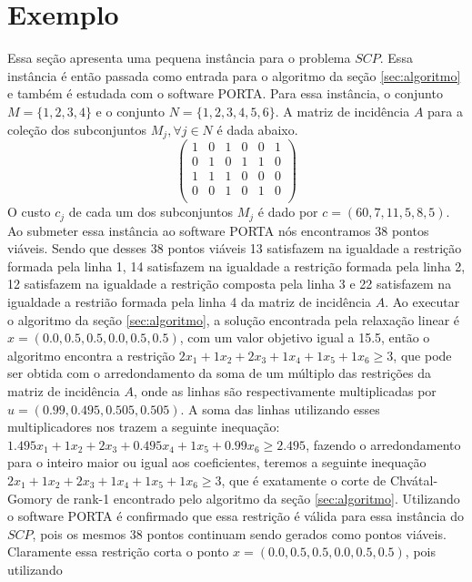 \section{Exemplo}\label{sec:exemplo} 
Essa seção apresenta uma pequena instância para o problema $SCP$. Essa instância é então 
passada como entrada para o algoritmo da seção \ref{sec:algoritmo} e também é estudada com o software PORTA.
Para essa instância, o conjunto $M=\{1,2,3,4\}$ e o conjunto $N=\{1,2,3,4,5,6\}$. A matriz de incidência
$A$ para a coleção dos subconjuntos $M_j, \forall j \in N$ é dada abaixo.
$$
\begin{pmatrix} 
    1 & 0 & 1 & 0 & 0 & 1 \\ 
    0 & 1 & 0 & 1 & 1 & 0 \\ 
    1 & 1 & 1 & 0 & 0 & 0 \\ 
    0 & 0 & 1 & 0 & 1 & 0 \\ 
\end{pmatrix}
$$
O custo $c_j$ de cada um dos subconjuntos $M_j$ é dado por $c = (60, 7, 11, 5, 8, 5)$.\\
Ao submeter essa instância ao software PORTA nós encontramos 38 pontos viáveis. Sendo que desses 38 pontos viáveis
13 satisfazem na igualdade a restrição formada pela linha 1, 14 satisfazem na igualdade
a restrição formada pela linha 2, 12 satisfazem na igualdade a restrição composta pela linha 3 e 22 satisfazem na igualdade a
restrião formada pela linha 4 da matriz de incidência $A$. Ao executar o algoritmo
da seção \ref{sec:algoritmo}, a solução encontrada pela relaxação linear é $x=(0.0, 0.5, 0.5, 0.0, 0.5, 0.5)$, 
com um valor objetivo igual a 15.5, então o algoritmo encontra
a restrição $2x_1 + 1x_2 + 2x_3 + 1x_4 + 1x_5 + 1x_6 \ge 3$, que pode ser obtida com o arredondamento da soma de
um múltiplo das restrições da matriz de incidência $A$, onde as linhas são respectivamente multiplicadas
por $u=(0.99,0.495,0.505,0.505)$. A soma das linhas utilizando esses multiplicadores nos trazem a seguinte inequação:
$1.495x_1 + 1x_2 + 2x_3 + 0.495x_4 + 1x_5 + 0.99x_6 \ge 2.495$, fazendo o arredondamento para o inteiro maior ou igual
aos coeficientes, teremos a seguinte inequação $2x_1 + 1x_2 + 2x_3 + 1x_4 + 1x_5 + 1x_6 \ge 3$, que é exatamente
o corte de Chvátal-Gomory de rank-1 encontrado pelo algoritmo da seção \ref{sec:algoritmo}. Utilizando o software PORTA
é confirmado que essa restrição é válida para essa instância do $SCP$, pois os mesmos 38 pontos continuam sendo gerados
como pontos viáveis. Claramente essa restrição corta o ponto $x=(0.0, 0.5, 0.5, 0.0, 0.5, 0.5)$, pois utilizando 
